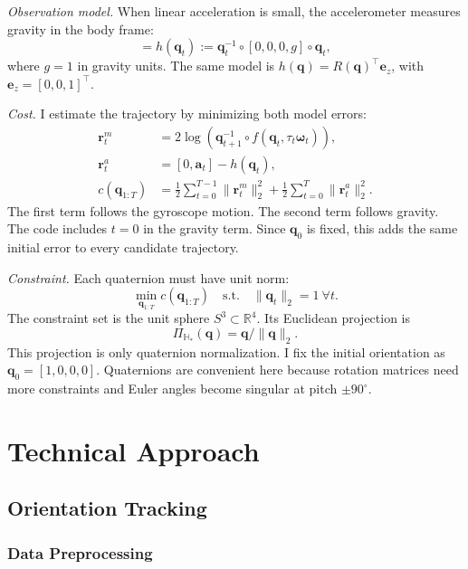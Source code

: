\documentclass[letterpaper, 10pt, conference]{ieeeconf}
\newcommand{\q}{\mathbf{q}}
\newcommand{\w}{\boldsymbol{\omega}}
\newcommand{\ez}{\mathbf{e}_z}
\newcommand{\Hstar}{\mathbb{H}_*}
\newcommand{\dg}{^\circ}
\begin{document}
\emph{Observation model.} When linear acceleration is small, the accelerometer
measures gravity in the body frame:
\begin{equation}
[0,\mathbf{a}_t]=h(\q_t):=\q_t^{-1}\circ[0,0,0,g]\circ\q_t,
\label{eq:obs}
\end{equation}
where $g=1$ in gravity units. The same model is
$h(\q)=R(\q)^\top\ez$, with $\ez=[0,0,1]^\top$.

\emph{Cost.} I estimate the trajectory by minimizing both model errors:
\begin{equation}
\begin{aligned}
\mathbf r_t^m&=2\log\!\left(
\q_{t+1}^{-1}\circ f(\q_t,\tau_t\w_t)\right),\\
\mathbf r_t^a&=[0,\mathbf a_t]-h(\q_t),\\
c(\q_{1:T})&=\tfrac12\sum_{t=0}^{T-1}\|\mathbf r_t^m\|_2^2
+\tfrac12\sum_{t=0}^{T}\|\mathbf r_t^a\|_2^2.
\end{aligned}
\label{eq:cost}
\end{equation}
The first term follows the gyroscope motion. The second term follows gravity.
The code includes $t=0$ in the gravity term. Since $\q_0$ is fixed, this adds
the same initial error to every candidate trajectory.

\emph{Constraint.} Each quaternion must have unit norm:
\begin{equation}
\min_{\q_{1:T}}c(\q_{1:T})\quad\text{s.t.}\quad\|\q_t\|_2=1\ \forall t.
\label{eq:constrained}
\end{equation}
The constraint set is the unit sphere $S^3\subset\mathbb{R}^4$. Its Euclidean
projection is
\begin{equation}
\Pi_{\Hstar}(\q)=\q/\|\q\|_2.
\label{eq:proj}
\end{equation}
This projection is only quaternion normalization. I fix the initial orientation
as $\q_0=[1,0,0,0]$. Quaternions are convenient here because rotation matrices
need more constraints and Euler angles become singular at pitch $\pm90\dg$.

\section{Technical Approach}

\subsection{Orientation Tracking}

\subsubsection{Data Preprocessing}
\end{document}
